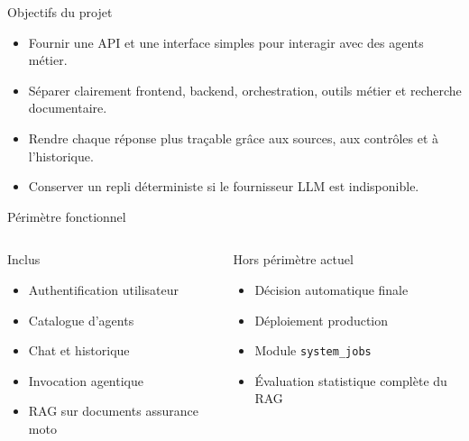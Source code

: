 \documentclass[aspectratio=169]{beamer}
\begin{document}
\begin{frame}{Objectifs du projet}
  \begin{itemize}
    \item Fournir une API et une interface simples pour interagir avec des agents métier.
    \item Séparer clairement frontend, backend, orchestration, outils métier et recherche documentaire.
    \item Rendre chaque réponse plus traçable grâce aux sources, aux contrôles et à l'historique.
    \item Conserver un repli déterministe si le fournisseur LLM est indisponible.
  \end{itemize}
\end{frame}

\begin{frame}{Périmètre fonctionnel}
  \begin{columns}[T]
      \begin{block}{Inclus}
        \begin{itemize}
          \item Authentification utilisateur
          \item Catalogue d'agents
          \item Chat et historique
          \item Invocation agentique
          \item RAG sur documents assurance moto
        \end{itemize}
      \end{block}
      \begin{block}{Hors périmètre actuel}
        \begin{itemize}
          \item Décision automatique finale
          \item Déploiement production
          \item Module \texttt{system\_jobs}
          \item Évaluation statistique complète du RAG
        \end{itemize}
      \end{block}
  \end{columns}
\end{frame}
\end{document}
